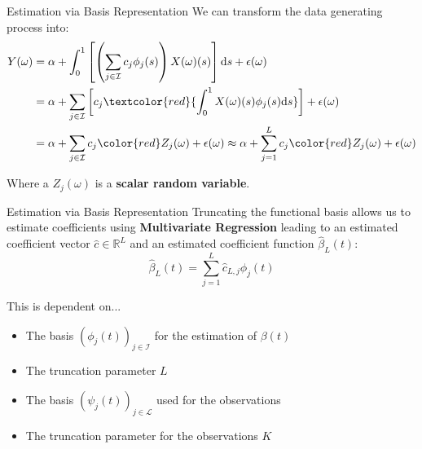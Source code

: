 \documentclass{beamer}
\begin{document}
	\begin{frame}{Estimation via Basis Representation}\label{ReducedEq}
		We can transform the data generating process into:
		\begin{equation}\notag
			\begin{split}
				Y(\omega) & = \alpha + \int_{0}^{1}\left[\left(\sum_{j \in \mathcal{I}} c_j  \phi_j(s)\right) X(\omega)(s) \right]\mathrm{d}s + \epsilon(\omega) \\
						  & = \alpha + \sum_{j \in \mathcal{I}} \left[c_j \textcolor{red}{\int_{0}^{1} X(\omega)(s) \phi_j(s)\mathrm{d}s}\right] + \epsilon(\omega)	 \\
						  & = \alpha + \sum_{j \in \mathcal{I}} c_j {\color{red}Z_j(\omega)} + \epsilon(\omega)  \approx  \alpha + \sum_{j = 1}^{L} c_j {\color{red}Z_j(\omega)}  + \epsilon(\omega)
			\end{split}
		\end{equation}
	
		Where a $Z_j(\omega)$ is a \textbf{scalar random variable}.
		\vspace{0.2cm}
		
		\hyperlink{FullEq}{}
	\end{frame}

	\begin{frame}{Estimation via Basis Representation}
		Truncating the functional basis allows us to estimate coefficients using \textbf{Multivariate Regression} leading to an estimated coefficient vector $\hat{c} \in \mathbb{R}^L$ and an estimated coefficient function $\hat{\beta}_L(t)$:
		\vspace{-0.2cm}
		$$\hat{\beta}_L(t) = \sum_{j = 1}^{L} \hat{c}_{L,j} \phi_j(t)$$
		
		This is dependent on...\vspace{-0.2cm}
		\begin{multicols}{2}
			\begin{itemize}
				\item The basis $(\phi_j(t))_{j \in \mathcal{I}}$ for the estimation of $\beta(t)$
				\item The truncation parameter $L$\vfill\null
				\item The basis $(\psi_j(t))_{j \in \mathcal{L}}$ used for the observations
				\item The truncation parameter for the observations $K$
			\end{itemize}
		\end{multicols}
	\end{frame}
\end{document}
